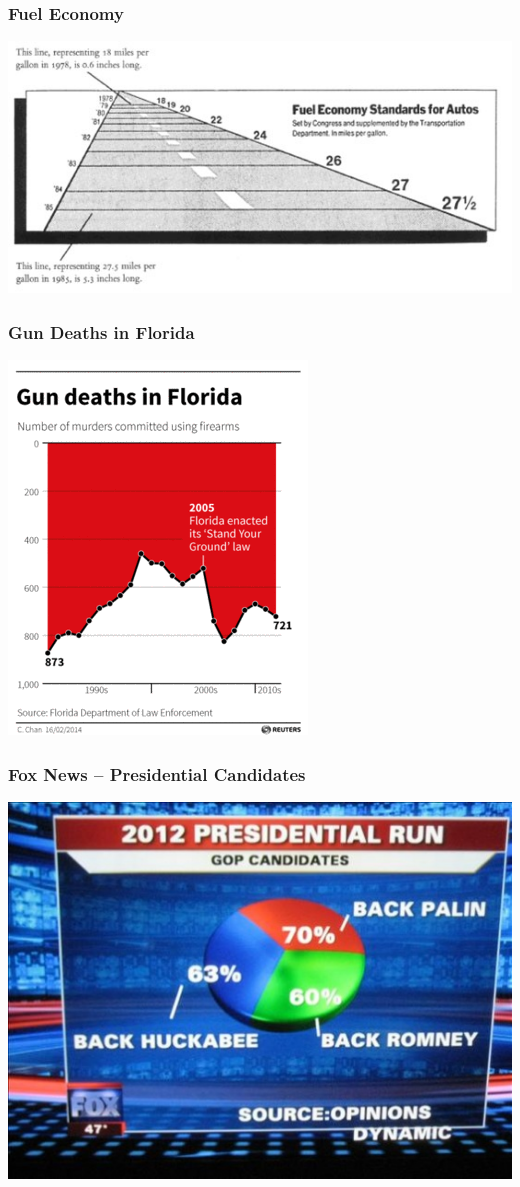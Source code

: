 \documentclass{beamer} %
\begin{document}
\begin{frame}\frametitle{Fuel Economy}
		\centering
	\includegraphics[width=\linewidth]{fuel.jpg}
\end{frame}


\begin{frame}\frametitle{Gun Deaths in Florida}
	\centering
	\includegraphics[width=0.6\linewidth]{guns.png}
\end{frame}


\begin{frame}\frametitle{Fox News -- Presidential Candidates}
	\centering
	\includegraphics[width=0.8\linewidth]{foxnews.jpg}
\end{frame}
\end{document}
